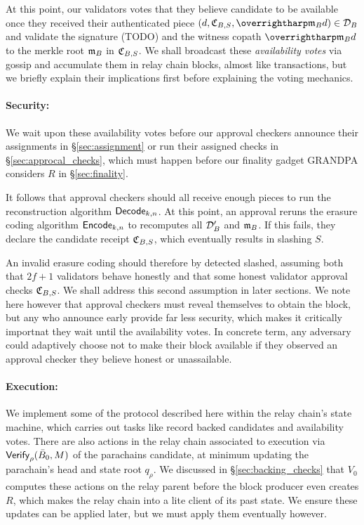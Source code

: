 At this point, our validators votes that they believe candidate to be available once they received their authenticated piece $(d,\receipt_{B,S},\vect{\merkleroot_B d}) \in \pieces_B$ and validate the signature (TODO) and the witness copath $\vect{\merkleroot_B d}$ to the merkle root $\mathfrak{m}_B$ in $\mathfrak{C}_{B,S}$.  We shall broadcast these {\em availability votes} via gossip and accumulate them in relay chain blocks, almost like transactions, but we briefly explain their implications first before explaining the voting mechanics.

\smallskip
\paragraph{Security:}

We wait upon these availability votes before our approval checkers announce their assignments in \S\ref{sec:assignment} or run their assigned checks in \S\ref{sec:approcal_checks}, which must happen before our finality gadget GRANDPA considers $R$ in \S\ref{sec:finality}. 
 
It follows that approval checkers should all receive enough pieces to run the reconstruction algorithm $\mathsf{Decode}_{k,n}$.  At this point, an approval reruns the erasure coding algorithm $\mathsf{Encode}_{k,n}$ to  recomputes all $\mathcal{D}'_B$ and $\mathfrak{m}_B$.  If this fails, they declare the candidate receipt $\mathfrak{C}_{B,S}$, which eventually results in slashing $S$.  

An invalid erasure coding should therefore by detected slashed, assuming both that $2f+1$ validators behave honestly and that some honest validator approval checks $\mathfrak{C}_{B,S}$.
%
We shall address this second assumption in later sections.  We note here however that approval checkers must reveal themselves to obtain the block, but any who announce early provide far less security, which makes it critically importnat they wait until the availability votes.  In concrete term, any adversary could adaptively choose not to make their block available if they observed an approval checker they believe honest or unassailable.  

\smallskip
\paragraph{Execution:}

We implement some of the protocol described here within the relay chain's state machine, which carries out tasks like record backed candidates and availability votes.  
%
There are also actions in the relay chain associated to execution via $\mathsf{Verify}_{\rho}(\bar{B}_0,M)$ of the parachains candidate, at minimum updating the parachain's head and state root $q_\rho$.  We discussed in \S\ref{sec:backing_checks} that $V_0$ computes these actions on the relay parent before the block producer even creates $R$, which makes the relay chain into a lite client of its past state.  We ensure these updates can be applied later, but we must apply them eventually however.

